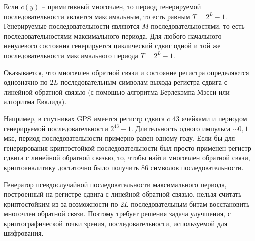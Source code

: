 Если $c(y)$ -- примитивный многочлен, то период генерируемой последовательности является максимальным, то есть равным $T = 2^{L} - 1$. Генерируемые последовательности являются $M$-последовательностями, то есть последовательностями максимального периода. Для любого начального ненулевого состояния генерируется циклический сдвиг одной и той же последовательности максимального периода $T=2^{L} - 1$.

Оказывается, что многочлен обратной связи и состояние регистра определяются однозначно по $2L$ последовательным символам выхода регистра сдвига с линейной обратной связью (с помощью алгоритма Берлекэмпа-Мэсси или алгоритма Евклида).

Например, в спутниках GPS имеется регистр сдвига c 43 ячейками и периодом генерируемой последовательности $2^{43} - 1$. Длительность одного импульса $\sim 0,1$ мкс, период последовательности примерно равен одному году. Если бы для генерирования криптостойкой последовательности был просто применен регистр сдвига с линейной обратной связью, то, чтобы найти многочлен обратной связи, криптоаналитику достаточно было получить 86 символов последовательности.

Генератор псевдослучайной последовательности максимального периода, построенный на регистре сдвига с линейной обратной связью, нельзя считать криптостойким из-за возможности по $2L$ последовательным битам восстановить многочлен обратной связи. Поэтому требует решения задача улучшения, с криптографической точки зрения, последовательности, используемой для шифрования.

